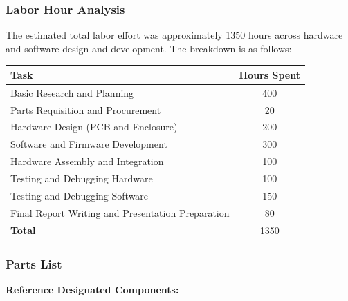 \documentclass[12pt]{article}
\begin{document}
\subsubsection{Labor Hour Analysis}

The estimated total labor effort was approximately 1350 hours across hardware and software design and development. The breakdown is as follows:

\begin{center}
\begin{tabular}{|l|c|}
\hline
\textbf{Task} & \textbf{Hours Spent} \\
\hline
Basic Research and Planning & 400 \\
Parts Requisition and Procurement & 20 \\
Hardware Design (PCB and Enclosure) & 200 \\
Software and Firmware Development & 300 \\
Hardware Assembly and Integration & 100 \\
Testing and Debugging Hardware & 100 \\
Testing and Debugging Software & 150 \\
Final Report Writing and Presentation Preparation & 80 \\
\hline
\textbf{Total} & 1350 \\
\hline
\end{tabular}
\end{center}

\subsubsection{Parts List}

\textbf{Reference Designated Components:}
\end{document}
